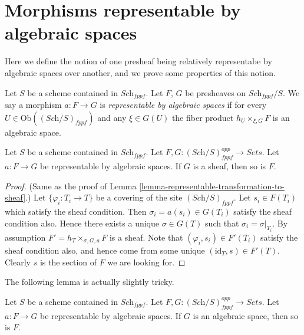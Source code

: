 \section{Morphisms representable by algebraic spaces}
\label{section-morphism-representable-by-spaces}

\noindent
Here we define the notion of one presheaf being relatively representabe
by algebraic spaces over another, and we prove some properties of this notion.

\begin{definition}
\label{definition-morphism-representable-by-spaces}
Let $S$ be a scheme contained in $\textit{Sch}_{fppf}$.
Let $F$, $G$ be presheaves on $\textit{Sch}_{fppf}/S$.
We say a morphism $a : F \to G$ is
{\it representable by algebraic spaces}
if for every $U \in \text{Ob}((\textit{Sch}/S)_{fppf})$ and
any $\xi \in G(U)$ the fiber product $h_U \times_{\xi, G} F$
is an algebraic space.
\end{definition}

\begin{lemma}
\label{lemma-representable-by-spaces-transformation-to-sheaf}
Let $S$ be a scheme contained in $\textit{Sch}_{fppf}$.
Let $F, G : (\textit{Sch}/S)_{fppf}^{opp} \to \textit{Sets}$.
Let $a : F \to G$ be representable by algebraic spaces.
If $G$ is a sheaf, then so is $F$.
\end{lemma}

\begin{proof}
(Same as the proof of Lemma \ref{lemma-representable-transformation-to-sheaf}.)
Let $\{\varphi_i : T_i \to T\}$ be a covering of the site
$(\textit{Sch}/S)_{fppf}$.
Let $s_i \in F(T_i)$ which satisfy the sheaf condition.
Then $\sigma_i = a(s_i) \in G(T_i)$ satisfy the sheaf condition
also. Hence there exists a unique $\sigma \in G(T)$ such
that $\sigma_i = \sigma|_{T_i}$. By assumption
$F' = h_{T} \times_{\sigma, G, a} F$ is a sheaf.
Note that $(\varphi_i, s_i) \in F'(T_i)$ satisfy the
sheaf condition also, and hence come from some unique
$(\text{id}_T, s) \in F'(T)$. Clearly $s$ is the section of
$F$ we are looking for.
\end{proof}

\noindent
The following lemma is actually slightly tricky.

\begin{lemma}
\label{lemma-representable-by-spaces-over-space}
Let $S$ be a scheme contained in $\textit{Sch}_{fppf}$.
Let $F, G : (\textit{Sch}/S)_{fppf}^{opp} \to \textit{Sets}$.
Let $a : F \to G$ be representable by algebraic spaces.
If $G$ is an algebraic space, then so is $F$.
\end{lemma}

